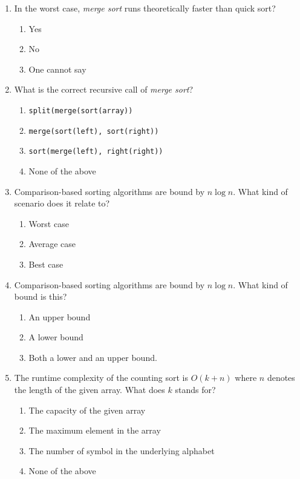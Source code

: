 \documentclass[11pt]{article}
\begin{document}
\begin{enumerate}
\item In the worst case, \emph{merge sort} runs theoretically faster than
quick sort?
\begin{enumerate}
\item Yes
\item No
\item One cannot say
\end{enumerate}

\item What is the correct recursive call of \emph{merge sort}?
\begin{enumerate}
\item \texttt{split(merge(sort(array))}
\item \texttt{merge(sort(left), sort(right))}
\item \texttt{sort(merge(left), right(right))}
\item None of the above
\end{enumerate}

\item Comparison-based sorting algorithms are bound by \(n \log n\). What
kind of scenario does it relate to?
\begin{enumerate}
\item Worst case
\item Average case
\item Best case
\end{enumerate}

\item Comparison-based sorting algorithms are bound by \(n \log n\). What
kind of bound is this?
\begin{enumerate}
\item An upper bound
\item A lower bound
\item Both a lower and an upper bound.
\end{enumerate}

\item The runtime complexity of the counting sort is \(O(k + n)\) where \(n\)
denotes the length of the given array. What does \(k\) stands for?
\begin{enumerate}
\item The capacity of the given array
\item The maximum element in the array
\item The number of symbol in the underlying alphabet
\item None of the above
\end{enumerate}


\end{enumerate}
\end{document}

